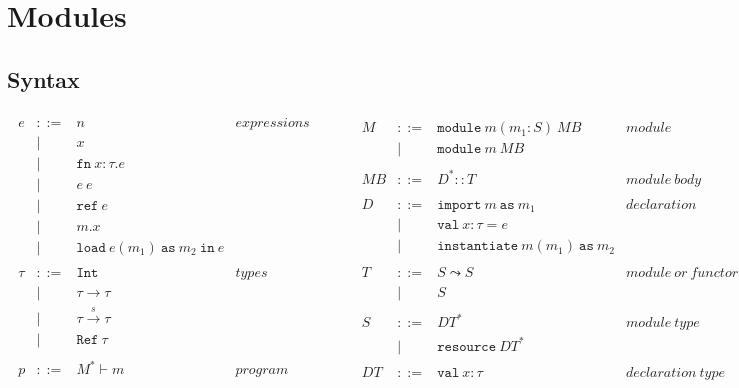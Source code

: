 \documentclass{llncs}
\newcommand{\keyw}[1]{\mathtt{#1}~}
\newcommand{\reftt}{\mathtt{ref}~}
\newcommand{\Reftt}{\mathtt{Ref}~}
\newcommand{\Inttt}{\mathtt{Int}~}
\begin{document}
\section{Modules}

\subsection{Syntax}

\[
\begin{array}{lll}
\begin{array}{lllr}
e & ::= & n & expressions \\
& | & x\\
& | & \keyw{fn} x : \tau . e \\
& | & e~e\\
& | & \reftt e \\
& | & m.x \\
& | & \keyw{load} e(m_1)~\keyw{as} m_2~\keyw{in} e \\
&&\\
\tau & ::= & \Inttt & types \\
& | & \tau \rightarrow \tau \\
& | & \tau \xrightarrow{s} \tau \\
& | & \Reftt \tau \\
&&\\
p & ::= & M^* \vdash m & program\\
\end{array}
& ~~~~~~
&
\begin{array}{lllr}
M & ::= & \keyw{module} m (m_1 : S)~MB & module \\
& | & \keyw{module} m~MB \\
&&\\
MB & ::= & D^* :: T & module~body\\
&&\\
D & ::= & \keyw{import} m~\keyw{as} m_1 & declaration \\
& | & \keyw{val} x : \tau = e \\
& | & \keyw{instantiate} m(m_1)~\keyw{as} m_2 \\
&&\\
T & ::= & S \leadsto S & module~or~functor~type\\
& | & S \\
&&\\
S & ::= & DT^* & module~type \\
& | & \keyw{resource} DT^* \\
&&\\
DT & ::= & \keyw{val} x : \tau & declaration~type
\end{array}
\end{array}
\]
\end{document}
